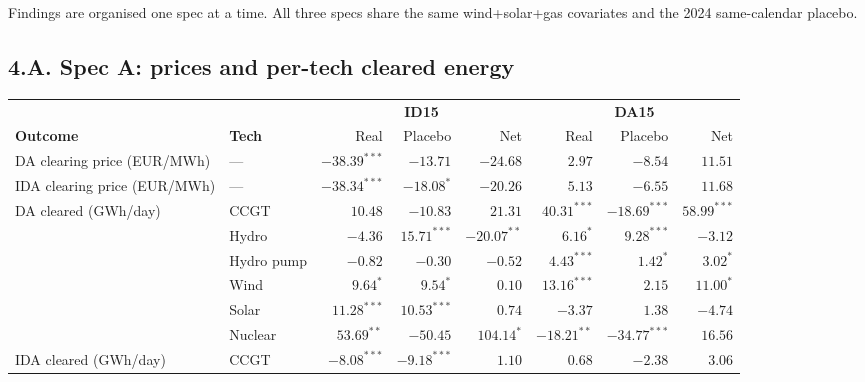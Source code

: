 \documentclass[11pt]{article}
\begin{document}
\noindent Findings are organised one spec at a time. All three specs share the same wind+solar+gas covariates and the 2024 same-calendar placebo.

\subsection*{4.A. Spec A: prices and per-tech cleared energy}
\label{sec:4-specA}
\begin{center}
\footnotesize
\setlength{\tabcolsep}{4pt}
\begin{tabular}{l l r r r r r r}
\toprule
                & & \multicolumn{3}{c}{\textbf{ID15}} & \multicolumn{3}{c}{\textbf{DA15}} \\
\cmidrule(lr){3-5} \cmidrule(lr){6-8}
\textbf{Outcome} & \textbf{Tech} & Real & Placebo & Net & Real & Placebo & Net \\
\midrule
DA clearing price (EUR/MWh)  & ---        & $-38.39^{***}$ & $-13.71$       & $-24.68$         & $2.97$         & $-8.54$         & $11.51$ \\
IDA clearing price (EUR/MWh) & ---        & $-38.34^{***}$ & $-18.08^{*}$   & $-20.26$         & $5.13$         & $-6.55$         & $11.68$ \\
\addlinespace
DA cleared (GWh/day)         & CCGT       & $10.48$        & $-10.83$       & $21.31$          & $40.31^{***}$  & $-18.69^{***}$  & $58.99^{***}$ \\
                             & Hydro      & $-4.36$        & $15.71^{***}$  & $-20.07^{**}$    & $6.16^{*}$     & $9.28^{***}$    & $-3.12$ \\
                             & Hydro pump & $-0.82$        & $-0.30$        & $-0.52$          & $4.43^{***}$   & $1.42^{*}$      & $3.02^{*}$ \\
                             & Wind       & $9.64^{*}$     & $9.54^{*}$     & $0.10$           & $13.16^{***}$  & $2.15$          & $11.00^{*}$ \\
                             & Solar      & $11.28^{***}$  & $10.53^{***}$  & $0.74$           & $-3.37$        & $1.38$          & $-4.74$ \\
                             & Nuclear    & $53.69^{**}$   & $-50.45$       & $104.14^{*}$     & $-18.21^{**}$  & $-34.77^{***}$  & $16.56$ \\
\addlinespace
IDA cleared (GWh/day)        & CCGT       & $-8.08^{***}$  & $-9.18^{***}$  & $1.10$           & $0.68$         & $-2.38$         & $3.06$ \\

\end{tabular}
\end{center}
\end{document}
